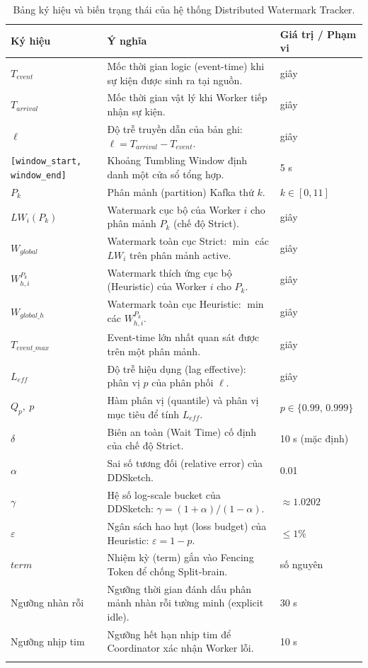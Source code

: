 \documentclass[12pt,a4paper]{article}
\begin{document}
\begin{longtable}{p{} p{} p{}}
\toprule
\textbf{Ký hiệu} & \textbf{Ý nghĩa} & \textbf{Giá trị / Phạm vi} \\
\midrule
\endhead
$T_{event}$ & Mốc thời gian logic (event-time) khi sự kiện được sinh ra tại nguồn. & giây \\
$T_{arrival}$ & Mốc thời gian vật lý khi Worker tiếp nhận sự kiện. & giây \\
$\ell$ & Độ trễ truyền dẫn của bản ghi: $\ell = T_{arrival} - T_{event}$. & giây \\
\texttt{[window\_start, window\_end]} & Khoảng Tumbling Window định danh một cửa sổ tổng hợp. & 5 s \\
$P_k$ & Phân mảnh (partition) Kafka thứ $k$. & $k \in [0, 11]$ \\
$LW_i(P_k)$ & Watermark cục bộ của Worker $i$ cho phân mảnh $P_k$ (chế độ Strict). & giây \\
$W_{global}$ & Watermark toàn cục Strict: $\min$ các $LW_i$ trên phân mảnh active. & giây \\
$W_{h,i}^{P_k}$ & Watermark thích ứng cục bộ (Heuristic) của Worker $i$ cho $P_k$. & giây \\
$W_{global\_h}$ & Watermark toàn cục Heuristic: $\min$ các $W_{h,i}^{P_k}$. & giây \\
$T_{event\_max}$ & Event-time lớn nhất quan sát được trên một phân mảnh. & giây \\
$L_{eff}$ & Độ trễ hiệu dụng (lag effective): phân vị $p$ của phân phối $\ell$. & giây \\
$Q_p,\ p$ & Hàm phân vị (quantile) và phân vị mục tiêu để tính $L_{eff}$. & $p \in \{0.99,\, 0.999\}$ \\
$\delta$ & Biên an toàn (Wait Time) cố định của chế độ Strict. & 10 s (mặc định) \\
$\alpha$ & Sai số tương đối (relative error) của DDSketch. & 0.01 \\
$\gamma$ & Hệ số log-scale bucket của DDSketch: $\gamma = (1+\alpha)/(1-\alpha)$. & $\approx 1.0202$ \\
$\varepsilon$ & Ngân sách hao hụt (loss budget) của Heuristic: $\varepsilon = 1 - p$. & $\le 1\%$ \\
$term$ & Nhiệm kỳ (term) gắn vào Fencing Token để chống Split-brain. & số nguyên \\
Ngưỡng nhàn rỗi & Ngưỡng thời gian đánh dấu phân mảnh nhàn rỗi tường minh (explicit idle). & 30 s \\
Ngưỡng nhịp tim & Ngưỡng hết hạn nhịp tim để Coordinator xác nhận Worker lỗi. & 10 s \\
\bottomrule
\caption{Bảng ký hiệu và biến trạng thái của hệ thống Distributed Watermark Tracker.}
\label{tab:glossary}
\end{longtable}
\end{document}
